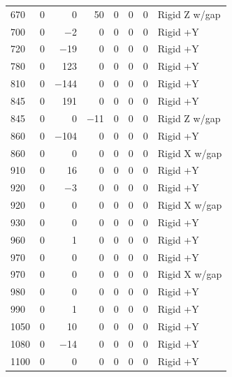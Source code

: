 \begin{longtable}{lrrrrrrl}
    670 & \num{0} & \num{0} & \num{50} & \num{0} & \num{0} & \num{0} & Rigid Z w/gap \\
    700 & \num{0} & \num{-2} & \num{0} & \num{0} & \num{0} & \num{0} & Rigid +Y \\
    720 & \num{0} & \num{-19} & \num{0} & \num{0} & \num{0} & \num{0} & Rigid +Y \\
    780 & \num{0} & \num{123} & \num{0} & \num{0} & \num{0} & \num{0} & Rigid +Y \\
    810 & \num{0} & \num{-144} & \num{0} & \num{0} & \num{0} & \num{0} & Rigid +Y \\
    845 & \num{0} & \num{191} & \num{0} & \num{0} & \num{0} & \num{0} & Rigid +Y \\
    845 & \num{0} & \num{0} & \num{-11} & \num{0} & \num{0} & \num{0} & Rigid Z w/gap \\
    860 & \num{0} & \num{-104} & \num{0} & \num{0} & \num{0} & \num{0} & Rigid +Y \\
    860 & \num{0} & \num{0} & \num{0} & \num{0} & \num{0} & \num{0} & Rigid X w/gap \\
    910 & \num{0} & \num{16} & \num{0} & \num{0} & \num{0} & \num{0} & Rigid +Y \\
    920 & \num{0} & \num{-3} & \num{0} & \num{0} & \num{0} & \num{0} & Rigid +Y \\
    920 & \num{0} & \num{0} & \num{0} & \num{0} & \num{0} & \num{0} & Rigid X w/gap \\
    930 & \num{0} & \num{0} & \num{0} & \num{0} & \num{0} & \num{0} & Rigid +Y \\
    960 & \num{0} & \num{1} & \num{0} & \num{0} & \num{0} & \num{0} & Rigid +Y \\
    970 & \num{0} & \num{0} & \num{0} & \num{0} & \num{0} & \num{0} & Rigid +Y \\
    970 & \num{0} & \num{0} & \num{0} & \num{0} & \num{0} & \num{0} & Rigid X w/gap \\
    980 & \num{0} & \num{0} & \num{0} & \num{0} & \num{0} & \num{0} & Rigid +Y \\
    990 & \num{0} & \num{1} & \num{0} & \num{0} & \num{0} & \num{0} & Rigid +Y \\
    1050 & \num{0} & \num{10} & \num{0} & \num{0} & \num{0} & \num{0} & Rigid +Y \\
    1080 & \num{0} & \num{-14} & \num{0} & \num{0} & \num{0} & \num{0} & Rigid +Y \\
    1100 & \num{0} & \num{0} & \num{0} & \num{0} & \num{0} & \num{0} & Rigid +Y \\

\end{longtable}
